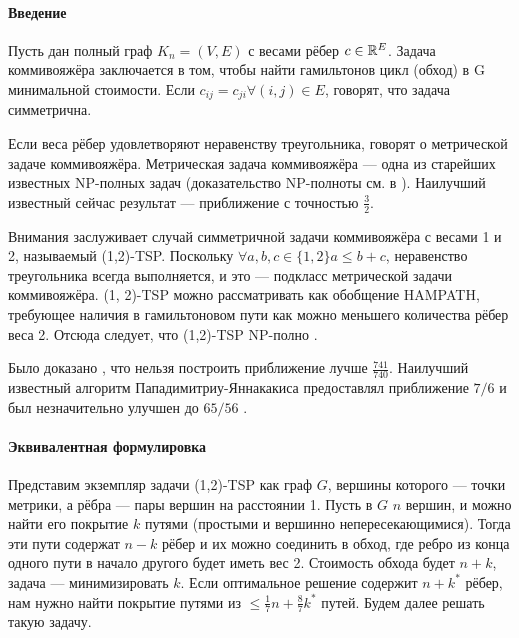 

\date{}




%

\paragraph{Введение}
Пусть дан полный граф $K_n = (V, E)$ с весами рёбер $c \in \mathbb{R}^E$. Задача коммивояжёра заключается в том, чтобы найти гамильтонов цикл (обход) в G минимальной стоимости. Если $c_{ij} = c_{ji} \forall (i, j)  \in E$, говорят, что задача симметрична. 

Если веса рёбер удовлетворяют неравенству треугольника, говорят о метрической задаче коммивояжёра. Метрическая задача коммивояжёра --- одна из старейших известных NP-полных задач (доказательство NP-полноты см. в \cite{JP85}). Наилучший известный сейчас результат --- приближение с точностью $\frac{3}{2}$\cite{C76}. 

Внимания заслуживает случай симметричной задачи коммивояжёра с весами 1 и 2, называемый (1,2)-TSP. Поскольку $\forall a, b, c \in \{1, 2\} a\le b+c$, неравенство треугольника всегда выполняется, и это --- подкласс метрической задачи коммивояжёра. (1, 2)-TSP можно рассматривать как обобщение HAMPATH, требующее наличия в гамильтоновом пути как можно меньшего количества рёбер веса 2. Отсюда следует, что (1,2)-TSP NP-полно \cite{K72}. 

Было доказано \cite{EK01}, что нельзя построить приближение лучше $\frac{741}{740}$. Наилучший известный алгоритм Пападимитриу-Яннакакиса \cite{PY93} предоставлял приближение $7/6$ и был незначительно улучшен до $65/56$ \cite{BR05}. 

\paragraph{Эквивалентная формулировка}
Представим экземпляр задачи (1,2)-TSP как граф $G$, вершины которого --- точки метрики, а рёбра --- пары вершин на расстоянии 1. Пусть в $G$ $n$ вершин, и можно найти его покрытие $k$ путями (простыми и вершинно непересекающимися). Тогда эти пути содержат $n-k$ рёбер и их можно соединить в обход, где ребро из конца одного пути в начало другого будет иметь вес 2. Стоимость обхода будет $n+k$, задача --- минимизировать $k$. Если оптимальное решение содержит $n+k^*$ рёбер, нам нужно найти покрытие путями из $\le \frac{1}{7}n+\frac{8}{7}k^*$ путей. Будем далее решать такую задачу.

